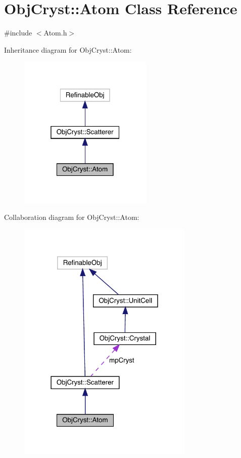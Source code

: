 \hypertarget{class_obj_cryst_1_1_atom}{}\section{Obj\+Cryst\+::Atom Class Reference}
\label{class_obj_cryst_1_1_atom}


{\ttfamily \#include $<$Atom.\+h$>$}



Inheritance diagram for Obj\+Cryst\+::Atom\+:
\nopagebreak
\begin{figure}[H]
\begin{center}
\leavevmode
\includegraphics[width=181pt]{class_obj_cryst_1_1_atom__inherit__graph}
\end{center}
\end{figure}


Collaboration diagram for Obj\+Cryst\+::Atom\+:
\nopagebreak
\begin{figure}[H]
\begin{center}
\leavevmode
\includegraphics[width=238pt]{class_obj_cryst_1_1_atom__coll__graph}
\end{center}
\end{figure}
